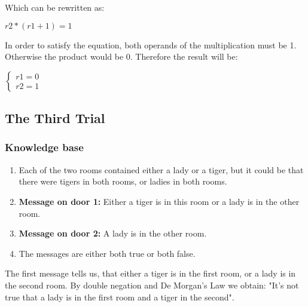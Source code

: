 Which can be rewritten as: 

\begin{center}
\begin{math}
 r2 * (r1 + 1) = 1
\end{math} 
\end{center}


In order to satisfy the equation, both operands of the multiplication must be 1. Otherwise the product would be 0. Therefore the result will be:

\begin{center}
\begin{math}
\begin{cases}
 r1 = 0\\
 r2 = 1
\end{cases}
\end{math} 
\end{center}







\subsection{The Third Trial}

\subsubsection{Knowledge base}

\begin{enumerate}

\item Each of the two rooms contained either a lady or a tiger, but it could be that there were tigers in both rooms, or ladies in both rooms.

\item \textbf{Message on door 1:} Either a tiger is in this room or a lady is in the other room.

\item \textbf{Message on door 2:} A lady is in the other room.

\item The messages are either both true or both false.

\end{enumerate}


The first message tells us, that either a tiger is in the first room, or a lady is in the second room. By double negation and De Morgan's Law we obtain: "It's not true that a lady is in the first room and a tiger in the second".


